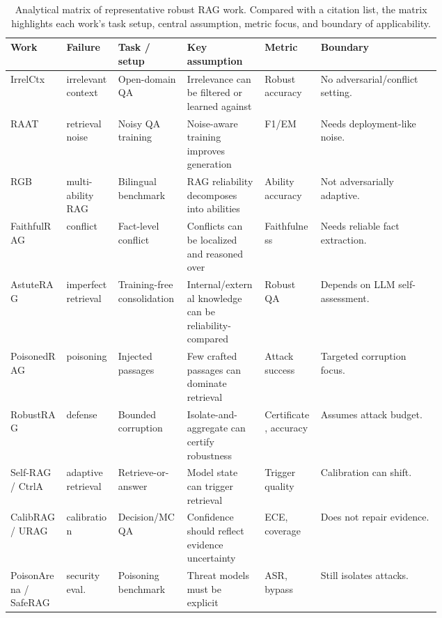 \documentclass[11pt]{article}
\begin{document}
\begin{table}[t]
\centering
\scriptsize
\renewcommand{\arraystretch}{0.92}
\begin{tabularx}{\linewidth}{>{\raggedright\arraybackslash}p{0.13\linewidth}>{\raggedright\arraybackslash}p{0.12\linewidth}>{\raggedright\arraybackslash}p{0.16\linewidth}>{\raggedright\arraybackslash}p{0.18\linewidth}>{\raggedright\arraybackslash}p{0.13\linewidth}>{\raggedright\arraybackslash}X}
\toprule
\textbf{Work} & \textbf{Failure} & \textbf{Task / setup} & \textbf{Key assumption} & \textbf{Metric} & \textbf{Boundary} \\
\midrule
IrrelCtx & irrelevant context & Open-domain QA & Irrelevance can be filtered or learned against & Robust accuracy & No adversarial/conflict setting. \\
RAAT & retrieval noise & Noisy QA training & Noise-aware training improves generation & F1/EM & Needs deployment-like noise. \\
RGB & multi-ability RAG & Bilingual benchmark & RAG reliability decomposes into abilities & Ability accuracy & Not adversarially adaptive. \\
FaithfulRAG & conflict & Fact-level conflict & Conflicts can be localized and reasoned over & Faithfulness & Needs reliable fact extraction. \\
AstuteRAG & imperfect retrieval & Training-free consolidation & Internal/external knowledge can be reliability-compared & Robust QA & Depends on LLM self-assessment. \\
PoisonedRAG & poisoning & Injected passages & Few crafted passages can dominate retrieval & Attack success & Targeted corruption focus. \\
RobustRAG & defense & Bounded corruption & Isolate-and-aggregate can certify robustness & Certificate, accuracy & Assumes attack budget. \\
Self-RAG / CtrlA & adaptive retrieval & Retrieve-or-answer & Model state can trigger retrieval & Trigger quality & Calibration can shift. \\
CalibRAG / URAG & calibration & Decision/MCQA & Confidence should reflect evidence uncertainty & ECE, coverage & Does not repair evidence. \\
PoisonArena / SafeRAG & security eval. & Poisoning benchmark & Threat models must be explicit & ASR, bypass & Still isolates attacks. \\
\bottomrule
\end{tabularx}
\caption{Analytical matrix of representative robust RAG work. Compared with a citation list, the matrix highlights each work's task setup, central assumption, metric focus, and boundary of applicability.}
\label{tab:analytical-matrix}
\end{table}
\end{document}
